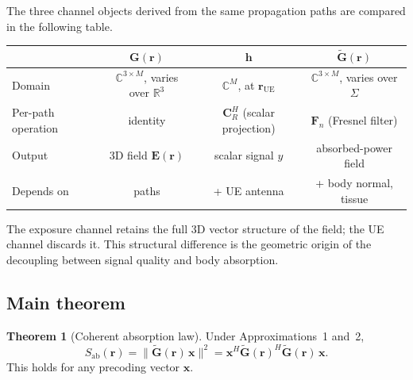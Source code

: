 \documentclass[11pt,a4paper]{article}
\theoremstyle{definition}      %
\newtheorem{theorem}{Theorem}[section]
\newcommand{\rr}{\mathbf{r}}
\newcommand{\Sab}{S_{\mathrm{ab}}}
\begin{document}
The three channel objects derived from the same propagation paths
are compared in the following table.

\begin{center}
\begin{tabular}{lccc}
\toprule
 & $\mathbf{G}(\mathbf{r})$ & $\mathbf{h}$ & $\tilde{\mathbf{G}}(\mathbf{r})$ \\
\midrule
Domain & $\mathbb{C}^{3\times M}$, varies over $\mathbb{R}^3$ &
  $\mathbb{C}^M$, at $\mathbf{r}_\mathrm{UE}$ &
  $\mathbb{C}^{3\times M}$, varies over $\Sigma$ \\
Per-path operation & identity & $\mathbf{C}_R^H$ (scalar projection) &
  $\mathbf{F}_n$ (Fresnel filter) \\
Output & 3D field $\mathbf{E}(\mathbf{r})$ & scalar signal $y$ &
  absorbed-power field \\
Depends on & paths & + UE antenna & + body normal, tissue \\
\bottomrule
\end{tabular}
\end{center}

The exposure channel retains the full 3D vector structure
of the field; the UE channel discards it.  This structural difference
is the geometric origin of the decoupling between signal quality and
body absorption.

\subsection{Main theorem}\label{sec:coherent-law-statement}

\begin{theorem}[Coherent absorption law]\label{thm:coherent-law}
Under Approximations~1 and~2,
\begin{equation}\label{eq:coherent-law}
  \boxed{\Sab(\rr) = \|\tilde{\mathbf{G}}(\rr)\,\mathbf{x}\|^2
  = \mathbf{x}^H\tilde{\mathbf{G}}(\rr)^H\tilde{\mathbf{G}}(\rr)\,\mathbf{x}.}
\end{equation}
This holds for any precoding vector $\mathbf{x}$.
\end{theorem}
\end{document}
